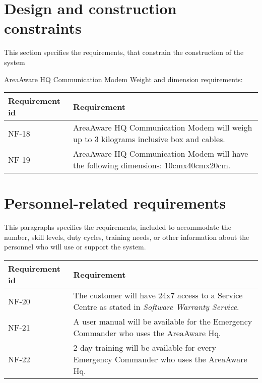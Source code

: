 \label{sec_nonFunc5}
\section{Design and construction constraints}
This section specifies the requirements, that constrain the construction of the system

AreaAware HQ Communication Modem Weight and dimension requirements:
\begin{longtable}{| p{3.2cm} |  p{10cm} | }
	\hline
	\textbf{Requirement id} &  \textbf{Requirement } \\
	\hline
	NF-18 & AreaAware HQ Communication Modem will weigh up to 3 kilograms inclusive box and cables.  \\
	\hline
	NF-19 & AreaAware HQ Communication Modem will have the following dimensions: 10cmx40cmx20cm. \\
	\hline
\end{longtable}

\label{sec_nonFunc6}
\section{Personnel-related requirements}
This paragraphs specifies the requirements, included to accommodate the number, skill levels, duty cycles, training needs, or other information about the personnel who will use or support the system.


\begin{longtable}{| p{3.2cm} |  p{10cm} | }
	\hline
	\textbf{Requirement id} &  \textbf{Requirement } \\
	\hline
	NF-20 &The customer will have 24x7 access to a Service Centre as stated in \emph{Software Warranty Service}.  \\
	\hline
	NF-21 & A user manual will be available for the Emergency Commander who uses the AreaAware Hq. \\
	\hline
	NF-22 & 2-day training will be available for every Emergency Commander who uses the AreaAware Hq. \\
	\hline
\end{longtable}



